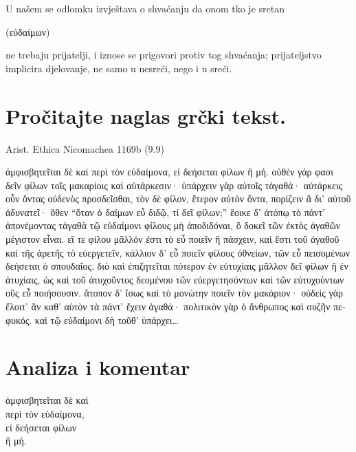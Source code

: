 U našem se odlomku izvještava o shvaćanju da onom tko je sretan \begin{greek}(εὐδαίμων)\end{greek} ne trebaju prijatelji, i iznose se prigovori protiv tog shvaćanja; prijateljstvo implicira djelovanje, ne samo u nesreći, nego i u sreći.


\section*{Pročitajte naglas grčki tekst.}

Arist. Ethica Nicomachea 1169b (9.9)


\medskip


{\large

\begin{greek}

\noindent  ἀμφισβητεῖται δὲ καὶ περὶ τὸν εὐδαίμονα, εἰ δεήσεται φίλων ἢ μή. οὐθὲν γάρ φασι δεῖν φίλων τοῖς μακαρίοις καὶ αὐτάρκεσιν· ὑπάρχειν γὰρ αὐτοῖς τἀγαθά· αὐτάρκεις οὖν ὄντας οὐδενὸς προσδεῖσθαι, τὸν δὲ φίλον, ἕτερον αὐτὸν ὄντα, πορίζειν ἃ δι' αὑτοῦ ἀδυνατεῖ· ὅθεν ``ὅταν ὁ δαίμων εὖ διδῷ, τί δεῖ φίλων;'' ἔοικε δ' ἀτόπῳ τὸ πάντ' ἀπονέμοντας τἀγαθὰ τῷ εὐδαίμονι φίλους μὴ ἀποδιδόναι, ὃ δοκεῖ τῶν ἐκτὸς ἀγαθῶν μέγιστον εἶναι. εἴ τε φίλου μᾶλλόν ἐστι τὸ εὖ ποιεῖν ἢ πάσχειν, καὶ ἔστι τοῦ ἀγαθοῦ καὶ τῆς ἀρετῆς τὸ εὐεργετεῖν, κάλλιον δ' εὖ ποιεῖν φίλους ὀθνείων, τῶν εὖ πεισομένων δεήσεται ὁ σπουδαῖος. διὸ καὶ ἐπιζητεῖται πότερον ἐν εὐτυχίαις μᾶλλον δεῖ φίλων ἢ ἐν ἀτυχίαις, ὡς καὶ τοῦ ἀτυχοῦντος δεομένου τῶν εὐεργετησόντων καὶ τῶν εὐτυχούντων οὓς εὖ ποιήσουσιν. ἄτοπον δ' ἴσως καὶ τὸ μονώτην ποιεῖν τὸν μακάριον· οὐδεὶς γὰρ ἕλοιτ' ἂν καθ' αὑτὸν τὰ πάντ' ἔχειν ἀγαθά· πολιτικὸν γὰρ ὁ ἄνθρωπος καὶ συζῆν πεφυκός. καὶ τῷ εὐδαίμονι δὴ τοῦθ' ὑπάρχει\dots

\end{greek}

}


\section*{Analiza i komentar}


{\large
\begin{greek}
\noindent  ἀμφισβητεῖται δὲ καὶ \\
\tabto{2em} περὶ τὸν εὐδαίμονα, \\
εἰ δεήσεται φίλων \\
\tabto{2em} ἢ μή.\\

\end{greek}
}

